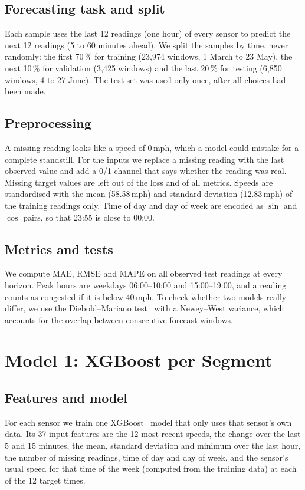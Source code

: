 \documentclass[11pt,a4paper]{article}
\begin{document}
\subsection{Forecasting task and split}
Each sample uses the last 12 readings (one hour) of every sensor to predict the next 12
readings (5 to 60 minutes ahead). We split the samples by time, never randomly: the first
70\,\% for training (23,974 windows, 1 March to 23 May), the next 10\,\% for validation
(3,425 windows) and the last 20\,\% for testing (6,850 windows, 4 to 27 June). The test set was
used only once, after all choices had been made.

\subsection{Preprocessing}
A missing reading looks like a speed of 0\,mph, which a model could mistake for a complete
standstill. For the inputs we replace a missing reading with the last observed value and add
a 0/1 channel that says whether the reading was real. Missing target values are left out of
the loss and of all metrics. Speeds are standardised with the mean (58.58\,mph) and standard
deviation (12.83\,mph) of the training readings only. Time of day and day of week are encoded
as $\sin$ and $\cos$ pairs, so that 23:55 is close to 00:00.

\subsection{Metrics and tests}
We compute MAE, RMSE and MAPE on all observed test readings at every horizon. Peak hours are
weekdays 06:00--10:00 and 15:00--19:00, and a reading counts as congested if it is below
40\,mph. To check whether two models really differ, we use the Diebold--Mariano
test~\cite{diebold1995} with a Newey--West variance, which accounts for the overlap between
consecutive forecast windows.

\section{Model 1: XGBoost per Segment}
\subsection{Features and model}
For each sensor we train one XGBoost~\cite{chen2016xgboost} model that only uses that
sensor's own data. Its 37 input features are the 12 most recent speeds, the change over the
last 5 and 15 minutes, the mean, standard deviation and minimum over the last hour, the
number of missing readings, time of day and day of week, and the sensor's usual speed for
that time of the week (computed from the training data) at each of the 12 target times.
\end{document}
